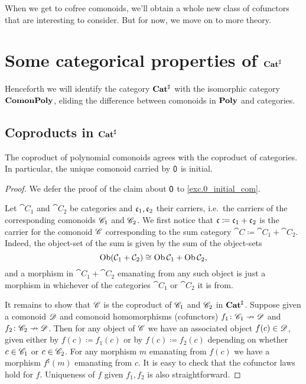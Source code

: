 \documentclass[Book-Poly]{subfiles}
\begin{document}
When we get to cofree comonoids, we'll obtain a whole new class of cofunctors that are interesting to consider. But for now, we move on to more theory.


\section{Some categorical properties of $\mathbf{Cat}^\sharp$} %
Henceforth we will identify the category $\mathbf{Cat}^\sharp$ with the isomorphic category $\mathbf{Comon}\mathbf{Poly}$, eliding the difference between comonoids in $\mathbf{Poly}$ and categories.


\subsection{Coproducts in $\mathbf{Cat}^\sharp$}

\begin{proposition}
The coproduct of polynomial comonoids agrees with the coproduct of categories. In particular, the unique comonoid carried by $\textsf{0}$ is initial.
\end{proposition}
\begin{proof}
We defer the proof of the claim about $\textsf{0}$ to \cref{exc.0_initial_com}.

Let $\cat{C}_1$ and $\cat{C}_2$ be categories and $\mathfrak{c}_1,\mathfrak{c}_2$ their carriers, i.e.\ the carriers of the corresponding comonoids $\mathscr{C}_1$ and $\mathscr{C}_2$. We first notice that $\mathfrak{c}\coloneqq\mathfrak{c}_1+\mathfrak{c}_2$ is the carrier for the comonoid $\mathscr{C}$ corresponding to the sum category $\cat{C}\coloneqq\cat{C}_1+\cat{C}_2$. Indeed, the object-set of the sum is given by the sum of the object-sets
\[
	\operatorname{Ob}(\mathcal{C}_1+\mathcal{C}_2)
  \cong
  \operatorname{Ob}\mathcal{C}_1+\operatorname{Ob}\mathcal{C}_2,
\]
and a morphism in $\cat{C}_1+\cat{C}_2$ emanating from any such object is just a morphism in whichever of the categories $\cat{C_1}$ or $\cat{C}_2$ it is from. 

It remains to show that $\mathscr{C}$ is the coproduct of $\mathscr{C}_1$ and $\mathscr{C}_2$ in $\mathbf{Cat}^\sharp$. Suppose given a comonoid $\mathscr{D}$ and comonoid homomorphisms (cofunctors) $f_1\colon\mathscr{C}_1\nrightarrow\mathscr{D}$ and $f_2\colon\mathscr{C}_2\nrightarrow\mathscr{D}$. Then for any object of $\mathscr{C}$ we have an associated object $f(c)\in\mathscr{D}$, given either by $f(c)\coloneqq f_1(c)$ or by $f(c)\coloneqq f_2(c)$ depending on whether $c\in\mathscr{C}_1$ or $c\in\mathscr{C}_2$. For any morphism $m$ emanating from $f(c)$ we have a morphism $f^\sharp(m)$ emanating from $c$. It is easy to check that the cofunctor laws hold for $f$. Uniqueness of $f$ given $f_1,f_2$ is also straightforward.
\end{proof}
\end{document}

